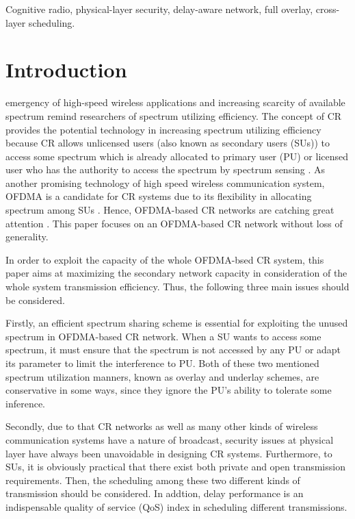 \documentclass[journal]{IEEEtran}
\begin{document}
\begin{IEEEkeywords}
Cognitive radio, physical-layer security, delay-aware network, full overlay, cross-layer scheduling.
\end{IEEEkeywords}






\IEEEpeerreviewmaketitle




\section{Introduction}

  emergency of high-speed wireless applications and  increasing scarcity of available spectrum remind
researchers of spectrum utilizing efficiency. The concept of CR  provides the potential
technology in increasing spectrum utilizing efficiency\cite{weiss2004spectrum,huang2011coolest}  because CR allows unlicensed users (also known as secondary users (SUs)) to access some
spectrum which is already allocated to primary user (PU) or licensed user who has the authority to access the spectrum by spectrum sensing \cite{6464545, 6099643}. As
another promising technology of high speed wireless communication system,  OFDMA   is a candidate for CR systems  \cite{weiss2004spectrum} due to its flexibility in allocating spectrum among SUs
\cite{lawrey1999multiuser}. Hence, OFDMA-based CR networks are catching great attention
\cite{zhou2011multiuser,zhou2011low}.  This paper focuses on an OFDMA-based CR network without loss of generality.

In order to exploit the capacity of the whole OFDMA-bsed CR system, this paper aims at maximizing the secondary network
capacity in consideration of the whole system transmission efficiency. Thus, the following three main issues should be considered.

Firstly, an efficient spectrum sharing scheme is  essential for exploiting the unused
spectrum  in OFDMA-based CR network. When a SU wants to access some spectrum,  it must ensure that the spectrum is
not accessed by any PU or  adapt its parameter to limit the  interference to PU. Both of these two mentioned spectrum utilization manners, known as overlay and underlay schemes, are conservative in some ways, since they ignore the PU's ability to tolerate some inference.


Secondly, due to that CR networks as well as many other kinds of wireless communication systems have a nature of broadcast,
security issues at physical layer have always been unavoidable in designing CR systems. Furthermore, to SUs, it is obviously practical that there exist both private and open transmission requirements. Then, the scheduling
among these two different kinds of transmission should be considered. In addtion,  delay performance is an indispensable quality of service (QoS) index in scheduling different transmissions.
\end{document}
